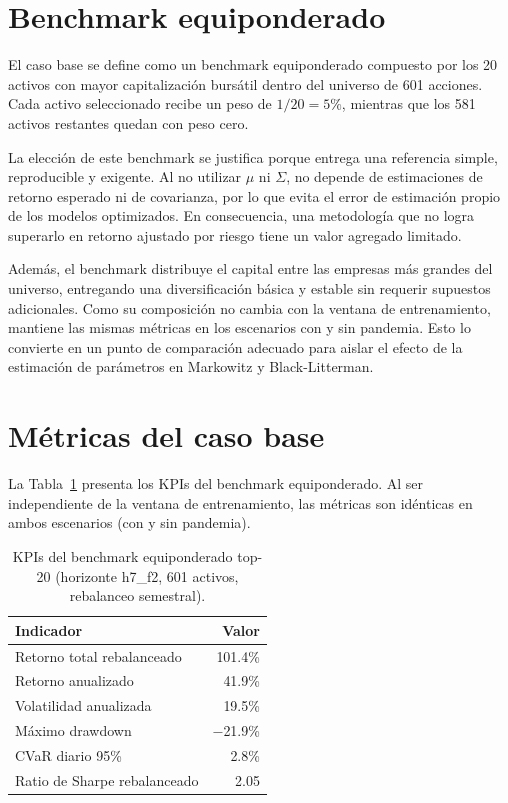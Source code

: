 \section{Benchmark equiponderado}

El caso base se define como un benchmark equiponderado compuesto por los 20 activos con mayor capitalizaci\'on burs\'atil dentro del universo de 601 acciones. Cada activo seleccionado recibe un peso de $1/20 = 5\%$, mientras que los 581 activos restantes quedan con peso cero.

La elecci\'on de este benchmark se justifica porque entrega una referencia simple, reproducible y exigente. Al no utilizar $\mu$ ni $\Sigma$, no depende de estimaciones de retorno esperado ni de covarianza, por lo que evita el error de estimaci\'on propio de los modelos optimizados. En consecuencia, una metodolog\'ia que no logra superarlo en retorno ajustado por riesgo tiene un valor agregado limitado.

Adem\'as, el benchmark distribuye el capital entre las empresas m\'as grandes del universo, entregando una diversificaci\'on b\'asica y estable sin requerir supuestos adicionales. Como su composici\'on no cambia con la ventana de entrenamiento, mantiene las mismas m\'etricas en los escenarios con y sin pandemia. Esto lo convierte en un punto de comparaci\'on adecuado para aislar el efecto de la estimaci\'on de par\'ametros en Markowitz y Black-Litterman.


\section{M\'etricas del caso base}

La Tabla~\ref{tab:benchmark_kpis} presenta los KPIs del benchmark
equiponderado. Al ser independiente de la ventana de entrenamiento, las
m\'etricas son id\'enticas en ambos escenarios (con y sin pandemia).

\begin{table}[h]
\centering
\caption{KPIs del benchmark equiponderado top-20 (horizonte h7\_f2, 601
activos, rebalanceo semestral).}
\label{tab:benchmark_kpis}
\scriptsize
\begin{tabular}{lr}
\hline
\textbf{Indicador} & \textbf{Valor} \\
\hline
Retorno total rebalanceado & 101.4\% \\
Retorno anualizado & 41.9\% \\
Volatilidad anualizada & 19.5\% \\
M\'aximo drawdown & $-$21.9\% \\
CVaR diario 95\% & 2.8\% \\
Ratio de Sharpe rebalanceado & 2.05 \\
\hline
\end{tabular}
\end{table}

